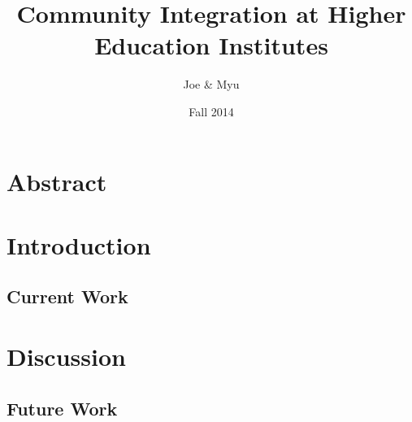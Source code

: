 \documentclass{article}
\title{Community Integration at Higher Education Institutes}
\author{Joe \& Myu}
\date{Fall 2014}
\begin{document}
 
\maketitle
 
\tableofcontents

\section{Abstract}

\section{Introduction}

\subsection{Current Work}

\section{Discussion}

\subsection{Future Work}
\end{document}
